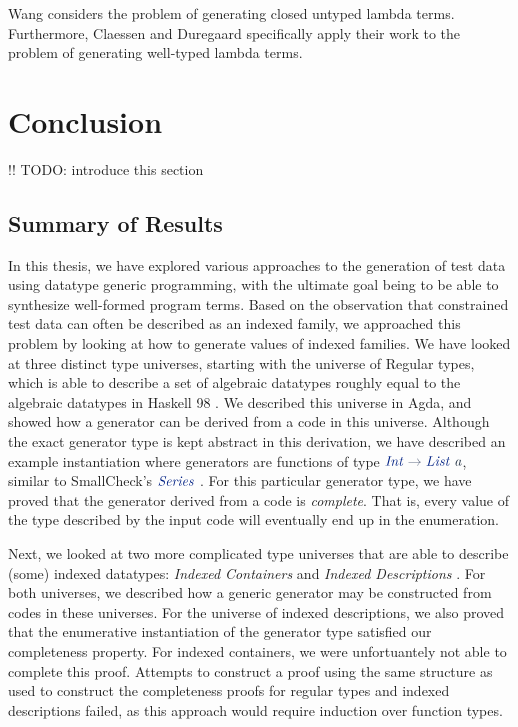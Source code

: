 \documentclass[a4paper,msc,twosized=semi]{uustthesis}
\newcommand*{\mathcolor}{}
\def\mathcolor#1#{\mathcoloraux{#1}}
\newcommand*{\mathcoloraux}[3]{%
  \protect\leavevmode
  \begingroup
    \color#1{#2}#3%
  \endgroup
}
\newcommand{\HSSym}[1]{\mathcolor{hsblue4}{#1}}
\newcommand{\HSCon}[1]{\mathcolor{hsblue3}{\mathit{#1}}}
\newcommand{\HSVar}[1]{\mathcolor{hsblue5}{\mathit{#1}}}
\begin{document}
  Wang \cite{wang2005generating} considers the problem of generating closed untyped 
  lambda terms. Furthermore, Claessen and Duregaard \cite{claessen2015generating} 
  specifically apply their work to the problem of generating well-typed lambda terms. 

\section{Conclusion}

  !! TODO: introduce this section

\subsection{Summary of Results}

  In this thesis, we have explored various approaches to the generation of test data 
  using datatype generic programming, with the ultimate goal being to be able to 
  synthesize well-formed program terms. Based on the observation that constrained test 
  data can often be described as an indexed family, we approached this problem by 
  looking at how to generate values of indexed families. We have looked at three 
  distinct type universes, starting with the universe of Regular types, which is able 
  to describe a set of algebraic datatypes roughly equal to the algebraic datatypes in 
  Haskell 98 \cite{jones2003haskell}. We described this universe in Agda, and showed 
  how a generator can be derived from a code in this universe. Although the exact 
  generator type is kept abstract in this derivation, we have described an example 
  instantiation where generators are functions of type \ensuremath{\HSCon{Int}\HSSym{\to} \HSCon{List}\;\HSVar{a}}, similar to 
  SmallCheck's \ensuremath{\HSCon{Series}} \cite{runciman2008smallcheck}. For this particular generator 
  type, we have proved that the generator derived from a code is \emph{complete}. That 
  is, every value of the type described by the input code will eventually end up in 
  the enumeration. 

  Next, we looked at two more complicated type universes that are able to describe 
  (some) indexed datatypes: \emph{Indexed Containers} \cite{altenkirch2015indexed} and 
  \emph{Indexed Descriptions} \cite{dagand2013cosmology}. For both universes, we 
  described how a generic generator may be constructed from codes in these universes. 
  For the universe of indexed descriptions, we also proved that the enumerative 
  instantiation of the generator type satisfied our completeness property. For indexed 
  containers, we were unfortuantely not able to complete this proof. Attempts to 
  construct a proof using the same structure as used to construct the completeness 
  proofs for regular types and indexed descriptions failed, as this approach would 
  require induction over function types. 
\end{document}
